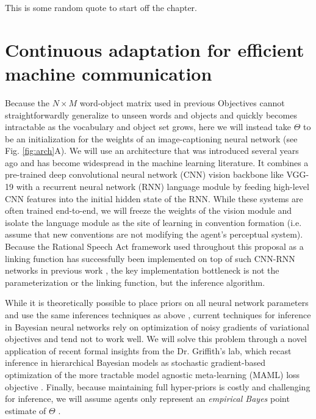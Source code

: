 \begin{savequote}[75mm]
This is some random quote to start off the chapter.
\end{savequote}

\chapter{Continuous adaptation for efficient machine communication}
\graphicspath{{./figures/nn_modeling/}}

Because the $N \times M$ word-object matrix used in previous Objectives cannot straightforwardly generalize to unseen words and objects and quickly becomes intractable as the vocabulary and object set grows, here we will instead take $\Theta$ to be an initialization for the weights of an image-captioning neural network (see Fig. \ref{fig:arch}A).
We will use an architecture that was introduced several years ago  and has become widespread in the machine learning literature.
It combines a pre-trained deep convolutional neural network (CNN) vision backbone like VGG-19 with a recurrent neural network (RNN) language module by feeding high-level CNN features into the initial hidden state of the RNN. 
While these systems are often trained end-to-end, we will freeze the weights of the vision module and isolate the language module as the site of learning in convention formation (i.e. assume that new conventions are not modifying the agent's perceptual system).
Because the Rational Speech Act framework used throughout this proposal as a linking function %
has successfully been implemented on top of such CNN-RNN networks in previous work , the key implementation bottleneck is not the parameterization or the linking function, but the inference algorithm.

While it is theoretically possible to place priors on all neural network parameters and use the same inferences techniques as above  , current techniques for inference in Bayesian neural networks rely on optimization of noisy gradients of variational objectives and tend not to work well. 
We will solve this problem through a novel application of recent formal insights from the Dr. Griffith's lab, which recast inference in hierarchical Bayesian models as stochastic gradient-based optimization of the more tractable model agnostic meta-learning (MAML) loss objective \cite{grant_recasting_2018}.
Finally, because maintaining full hyper-priors is costly and challenging for inference, we will assume agents only represent an \emph{empirical Bayes} point estimate of $\Theta$ \cite{gelman_bayesian_2014}.

